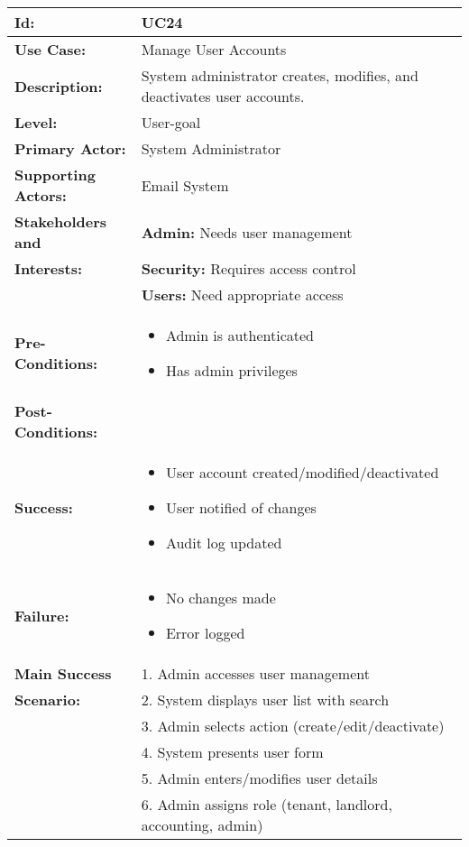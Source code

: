 \documentclass[12pt]{article}
\begin{document}
\begin{tabular}{|p{3cm}|p{11cm}|}
\hline
\textbf{Id:} & UC24 \\
\hline
\textbf{Use Case:} & Manage User Accounts \\
\hline
\textbf{Description:} & System administrator creates, modifies, and deactivates user accounts. \\
\hline
\textbf{Level:} & User-goal \\
\hline
\textbf{Primary Actor:} & System Administrator \\
\hline
\textbf{Supporting Actors:} & Email System \\
\hline
\textbf{Stakeholders and} & \textbf{Admin:} Needs user management \\
\textbf{Interests:} & \textbf{Security:} Requires access control \\
& \textbf{Users:} Need appropriate access \\
\hline
\textbf{Pre-Conditions:} & 
\begin{itemize}
    \item Admin is authenticated
    \item Has admin privileges
\end{itemize} \\
\hline
\textbf{Post-Conditions:} & \\
\textbf{Success:} & 
\begin{itemize}
    \item User account created/modified/deactivated
    \item User notified of changes
    \item Audit log updated
\end{itemize} \\
\textbf{Failure:} & 
\begin{itemize}
    \item No changes made
    \item Error logged
\end{itemize} \\
\hline
\textbf{Main Success} & 1. Admin accesses user management \\
\textbf{Scenario:} & 2. System displays user list with search \\
& 3. Admin selects action (create/edit/deactivate) \\
& 4. System presents user form \\
& 5. Admin enters/modifies user details \\
& 6. Admin assigns role (tenant, landlord, accounting, admin) \\

\end{tabular}
\end{document}

